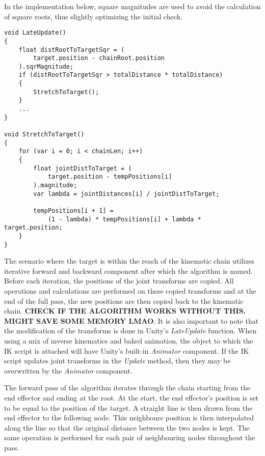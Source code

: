 In the implementation below, square magnitudes are used to
avoid the calculation of square roots, thus slightly optimizing the initial
check.

\begin{lstlisting}[basicstyle=\footnotesize, numbers=none,frame=single, caption={Target out of
reach},captionpos=b, label=stretch, language={[Sharp]c}]
void LateUpdate() 
{
    float distRootToTargetSqr = (
        target.position - chainRoot.position
    ).sqrMagnitude;
    if (distRootToTargetSqr > totalDistance * totalDistance)
    {
        StretchToTarget();
    }
    ...
}

void StretchToTarget()
{
    for (var i = 0; i < chainLen; i++)
    {
        float jointDistToTarget = (
            target.position - tempPositions[i]
        ).magnitude;
        var lambda = jointDistances[i] / jointDistToTarget;

        tempPositions[i + 1] =
            (1 - lambda) * tempPositions[i] + lambda * target.position;
    }
}
\end{lstlisting}

The scenario where the target is within the reach of the kinematic chain
utilizes iterative forward and backward component after which the algorithm is
named. Before each iteration, the positions of the joint transforms are copied.
All operations and calculations are performed on these copied transforms and at
the end of the full pass, the new positions are then copied back to the
kinematic chain. \textbf{CHECK IF THE ALGORITHM WORKS WITHOUT THIS. MIGHT SAVE
SOME MEMORY LMAO}. It is also important to note that the modification of the
transforms is done in Unity's \textit{LateUpdate} function. When using a mix of
inverse kinematics and baked animation, the object to which the IK script is
attached will have Unity's built-in \textit{Animator} component. If the IK
script updates joint transforms in the \textit{Update} method, then they may be
overwritten by the \textit{Animator} component. 

The forward pass of the algorithm iterates through the chain starting from the
end effector and ending at the root. At the start, the end effector's position
is set to be equal to the position of the target. A straight line is then drawn
from the end effector to the following node. This neighbours position is then
interpolated along the line so that the original distance between the two nodes
is kept. The same operation is performed for each pair of neighbouring nodes
throughout the pass. 

